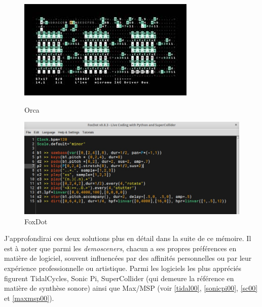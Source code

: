 \begin{figure}[h]
  \begin{minipage}[b]{0.45\linewidth}
    \centering
    \includegraphics[width=\linewidth]{images/experiments/orca00.jpg}
    \caption{Orca}
    \label{orca00}
  \end{minipage}
  \hspace{0.1\linewidth} %
  \begin{minipage}[b]{0.45\linewidth}
    \centering
    \includegraphics[width=\linewidth]{images/experiments/foxdot00.jpg}
    \caption{FoxDot}
    \label{foxdot00}
  \end{minipage}
\end{figure}

J'approfondirai ces deux solutions plus en détail dans la suite de ce mémoire. Il est à noter que parmi les \textit{demosceners}, chacun a ses propres préférences en matière de logiciel, souvent influencées par des affinités personnelles ou par leur expérience professionnelle ou artistique. Parmi les logiciels les plus appréciés figurent TidalCycles, Sonic Pi, SuperCollider (qui demeure la référence en matière de synthèse sonore) ainsi que Max/MSP (voir \ref{tidal00}, \ref{sonicpi00}, \ref{sc00} et \ref{maxmsp00}). 

